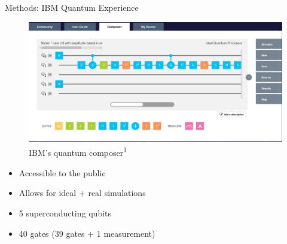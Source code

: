 \documentclass[10pt]{beamer}
\begin{document}
{
\begin{frame}[fragile]{Methods: IBM Quantum Experience}

\begin{figure}
\includegraphics[height=0.45\textwidth]{IBMamplitudecomposer.png}
       \caption{\footnotesize{IBM's quantum composer\textsuperscript{1}} }
\end{figure}
\vspace{-5mm}
\begin{minipage}[t]{.5\textwidth}
\begin{itemize}
\item Accessible to the public
\item Allows for ideal + real simulations
\end{itemize}
\end{minipage}%
\begin{minipage}[t]{.5\textwidth}
\begin{itemize}
\item 5 superconducting qubits
\item 40 gates (39 gates + 1 measurement)

\end{itemize}
\end{minipage}

\end{frame}
}
\end{document}
